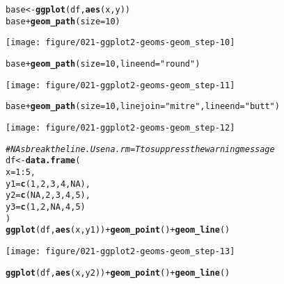 \documentclass[a4paper,titlepage]{tufte-handout}\usepackage[]{graphicx}\usepackage[]{color}
\makeatletter
\def\maxwidth{ %
  \ifdim\Gin@nat@width>\linewidth
    \linewidth
  \else
    \Gin@nat@width
  \fi
}
\newcommand{\hlnum}[1]{\textcolor[rgb]{0.686,0.059,0.569}{#1}}%
\newcommand{\hlstr}[1]{\textcolor[rgb]{0.192,0.494,0.8}{#1}}%
\newcommand{\hlcom}[1]{\textcolor[rgb]{0.678,0.584,0.686}{\textit{#1}}}%
\newcommand{\hlopt}[1]{\textcolor[rgb]{0,0,0}{#1}}%
\newcommand{\hlstd}[1]{\textcolor[rgb]{0.345,0.345,0.345}{#1}}%
\newcommand{\hlkwb}[1]{\textcolor[rgb]{0.69,0.353,0.396}{#1}}%
\newcommand{\hlkwc}[1]{\textcolor[rgb]{0.333,0.667,0.333}{#1}}%
\newcommand{\hlkwd}[1]{\textcolor[rgb]{0.737,0.353,0.396}{\textbf{#1}}}%
\newenvironment{kframe}{%
 \def\at@end@of@kframe{}%
 \ifinner\ifhmode%
  \def\at@end@of@kframe{\end{minipage}}%
  \begin{minipage}{\columnwidth}%
 \fi\fi%
 \def\FrameCommand##1{\hskip\@totalleftmargin \hskip-\fboxsep
 \colorbox{shadecolor}{##1}\hskip-\fboxsep
     \hskip-\linewidth \hskip-\@totalleftmargin \hskip\columnwidth}%
 \MakeFramed {\advance\hsize-\width
   \@totalleftmargin\z@ \linewidth\hsize
   \@setminipage}}%
 {\par\unskip\endMakeFramed%
 \at@end@of@kframe}
\newenvironment{knitrout}{}{} %
\makeatother
\begin{document}
\begin{knitrout}
\begin{kframe}
\begin{alltt}
\hlstd{base} \hlkwb{<-} \hlkwd{ggplot}\hlstd{(df,} \hlkwd{aes}\hlstd{(x, y))}
\hlstd{base} \hlopt{+} \hlkwd{geom_path}\hlstd{(}\hlkwc{size} \hlstd{=} \hlnum{10}\hlstd{)}
\end{alltt}
\end{kframe}
\texttt{[image: figure/021-ggplot2-geoms-geom\_step-10]} 
\begin{kframe}\begin{alltt}
\hlstd{base} \hlopt{+} \hlkwd{geom_path}\hlstd{(}\hlkwc{size} \hlstd{=} \hlnum{10}\hlstd{,} \hlkwc{lineend} \hlstd{=} \hlstr{"round"}\hlstd{)}
\end{alltt}
\end{kframe}
\texttt{[image: figure/021-ggplot2-geoms-geom\_step-11]} 
\begin{kframe}\begin{alltt}
\hlstd{base} \hlopt{+} \hlkwd{geom_path}\hlstd{(}\hlkwc{size} \hlstd{=} \hlnum{10}\hlstd{,} \hlkwc{linejoin} \hlstd{=} \hlstr{"mitre"}\hlstd{,} \hlkwc{lineend} \hlstd{=} \hlstr{"butt"}\hlstd{)}
\end{alltt}
\end{kframe}
\texttt{[image: figure/021-ggplot2-geoms-geom\_step-12]} 
\begin{kframe}\begin{alltt}
\hlcom{# NAs break the line. Use na.rm = T to suppress the warning message}
\hlstd{df} \hlkwb{<-} \hlkwd{data.frame}\hlstd{(}
  \hlkwc{x} \hlstd{=} \hlnum{1}\hlopt{:}\hlnum{5}\hlstd{,}
  \hlkwc{y1} \hlstd{=} \hlkwd{c}\hlstd{(}\hlnum{1}\hlstd{,} \hlnum{2}\hlstd{,} \hlnum{3}\hlstd{,} \hlnum{4}\hlstd{,} \hlnum{NA}\hlstd{),}
  \hlkwc{y2} \hlstd{=} \hlkwd{c}\hlstd{(}\hlnum{NA}\hlstd{,} \hlnum{2}\hlstd{,} \hlnum{3}\hlstd{,} \hlnum{4}\hlstd{,} \hlnum{5}\hlstd{),}
  \hlkwc{y3} \hlstd{=} \hlkwd{c}\hlstd{(}\hlnum{1}\hlstd{,} \hlnum{2}\hlstd{,} \hlnum{NA}\hlstd{,} \hlnum{4}\hlstd{,} \hlnum{5}\hlstd{)}
\hlstd{)}
\hlkwd{ggplot}\hlstd{(df,} \hlkwd{aes}\hlstd{(x, y1))} \hlopt{+} \hlkwd{geom_point}\hlstd{()} \hlopt{+} \hlkwd{geom_line}\hlstd{()}
\end{alltt}


{\ttfamily\noindent\color{warningcolor}{\#\# Warning: Removed 1 rows containing missing values (geom\_point).}}

{\ttfamily\noindent\color{warningcolor}{\#\# Warning: Removed 1 rows containing missing values (geom\_path).}}\end{kframe}
\texttt{[image: figure/021-ggplot2-geoms-geom\_step-13]} 
\begin{kframe}\begin{alltt}
\hlkwd{ggplot}\hlstd{(df,} \hlkwd{aes}\hlstd{(x, y2))} \hlopt{+} \hlkwd{geom_point}\hlstd{()} \hlopt{+} \hlkwd{geom_line}\hlstd{()}
\end{alltt}



\end{kframe}
\end{knitrout}
\end{document}
